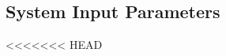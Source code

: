 \subsection*{System Input Parameters}
\hspace{10mm}
\renewcommand{\labelitemi}{\textbf{Parameter: }}
\renewcommand\labelitemii{\textbf{Description: }}
\renewcommand\labelitemiii{\textbf{Accepted Values: }}
<<<<<<< HEAD
%
%
%
%
%

